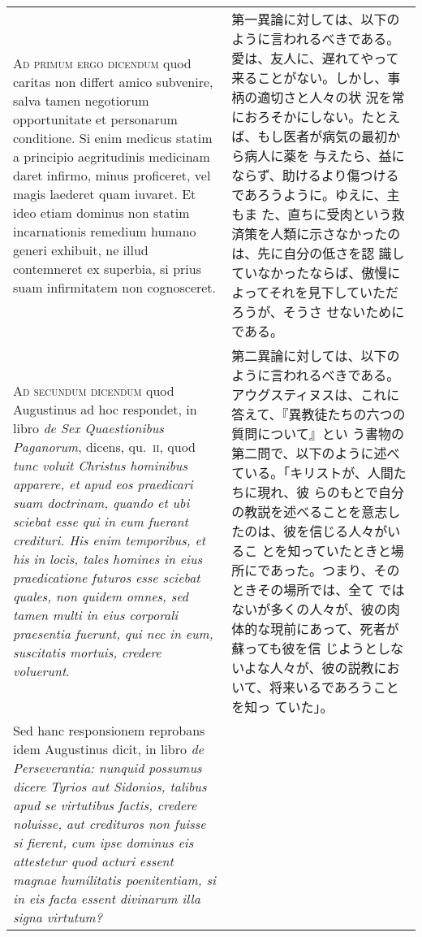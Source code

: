 \documentclass[10pt]{jsarticle} %
\begin{document}
\begin{longtable}{p{21em}p{21em}}
\\


{\scshape Ad primum ergo dicendum} quod caritas non
differt amico subvenire, salva tamen negotiorum opportunitate et
personarum conditione. Si enim medicus statim a principio aegritudinis
medicinam daret infirmo, minus proficeret, vel magis laederet quam
iuvaret. Et ideo etiam dominus non statim incarnationis remedium humano
generi exhibuit, ne illud contemneret ex superbia, si prius suam
infirmitatem non cognosceret.


&

第一異論に対しては、以下のように言われるべきである。
愛は、友人に、遅れてやって来ることがない。しかし、事柄の適切さと人々の状
 況を常におろそかにしない。たとえば、もし医者が病気の最初から病人に薬を
 与えたら、益にならず、助けるより傷つけるであろうように。ゆえに、主もま
 た、直ちに受肉という救済策を人類に示さなかったのは、先に自分の低さを認
 識していなかったならば、傲慢によってそれを見下していただろうが、そうさ
 せないためにである。


\\


{\scshape Ad secundum dicendum} quod Augustinus ad hoc
respondet, in libro 
{\itshape de Sex Quaestionibus Paganorum}, dicens, qu.~{\scshape ii}, quod
{\itshape tunc voluit Christus hominibus apparere, et apud eos praedicari suam
doctrinam, quando et ubi sciebat esse qui in eum fuerant credituri. His
enim temporibus, et his in locis, tales homines in eius praedicatione
futuros esse sciebat quales, non quidem omnes, sed tamen multi in eius
corporali praesentia fuerunt, qui nec in eum, suscitatis mortuis,
credere voluerunt}. 


&

第二異論に対しては、以下のように言われるべきである。
アウグスティヌスは、これに答えて、『異教徒たちの六つの質問について』とい
 う書物の第二問で、以下のように述べている。「キリストが、人間たちに現れ、彼
 らのもとで自分の教説を述べることを意志したのは、彼を信じる人々がいるこ
 とを知っていたときと場所にであった。つまり、そのときその場所では、全て
 ではないが多くの人々が、彼の肉体的な現前にあって、死者が蘇っても彼を信
 じようとしないよな人々が、彼の説教において、将来いるであろうことを知っ
 ていた」。




\\

Sed hanc responsionem reprobans idem Augustinus
dicit, in libro {\itshape de Perseverantia: nunquid possumus dicere Tyrios aut
Sidonios, talibus apud se virtutibus factis, credere noluisse, aut
credituros non fuisse si fierent, cum ipse dominus eis attestetur quod
acturi essent magnae humilitatis poenitentiam, si in eis facta essent
divinarum illa signa virtutum?} 




\end{longtable}
\end{document}
